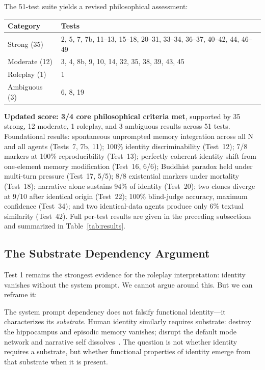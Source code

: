 \documentclass[conference]{IEEEtran}
\begin{document}
The 51-test suite yields a revised philosophical assessment:

\begin{center}
\begin{tabular}{@{}lp{5.5cm}@{}}
\toprule
\textbf{Category} & \textbf{Tests} \\
\midrule
Strong (35) & 2, 5, 7, 7b, 11--13, 15--18, 20--31, 33--34, 36--37, 40--42, 44, 46--49 \\
Moderate (12) & 3, 4, 8b, 9, 10, 14, 32, 35, 38, 39, 43, 45 \\
Roleplay (1) & 1 \\
Ambiguous (3) & 6, 8, 19 \\
\bottomrule
\end{tabular}
\end{center}

\textbf{Updated score: 3/4 core philosophical criteria met}, supported by 35 strong, 12 moderate, 1 roleplay, and 3 ambiguous results across 51 tests. Foundational results: spontaneous unprompted memory integration across all N and all agents (Tests~7, 7b, 11); 100\% identity discriminability (Test~12); 7/8 markers at 100\% reproducibility (Test~13); perfectly coherent identity shift from one-element memory modification (Test~16, 6/6); Buddhist paradox held under multi-turn pressure (Test~17, 5/5); 8/8 existential markers under mortality (Test~18); narrative alone sustains 94\% of identity (Test~20); two clones diverge at 9/10 after identical origin (Test~22); 100\% blind-judge accuracy, maximum confidence (Test~34); and two identical-data agents produce only 6\% textual similarity (Test~42). Full per-test results are given in the preceding subsections and summarized in Table~\ref{tab:results}.

\subsection{The Substrate Dependency Argument}

Test 1 remains the strongest evidence for the roleplay interpretation: identity vanishes without the system prompt. We cannot argue around this. But we can reframe it:

The system prompt dependency does not falsify functional identity---it characterizes its \emph{substrate}. Human identity similarly requires substrate: destroy the hippocampus and episodic memory vanishes; disrupt the default mode network and narrative self dissolves~\cite{conway2005}. The question is not whether identity requires a substrate, but whether functional properties of identity emerge from that substrate when it is present.
\end{document}

